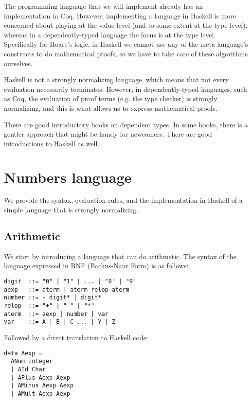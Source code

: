 \documentclass{article}
\begin{document}
The programming language that we will implement already has an implementation in Coq\cite{b3}. However, implementing a language in Haskell is more concerned about playing at the value level (and to some extent at the type level), whereas in a dependently-typed language the focus is at the type level. Specifically for Hoare's logic, in Haskell we cannot use any of the meta language's constructs to do mathematical proofs, so we have to take care of these algorithms ourselves.

Haskell is not a strongly normalizing language, which means that not every evaluation necessarily terminates. However, in dependently-typed languages, such as Coq\cite{b4}, the evaluation of proof terms (e.g. the type checker) is strongly normalizing, and this is what allows us to express mathematical proofs.

There are good introductory books on dependent types\cite{b3}. In some books, there is a gentler approach that might be handy for newcomers\cite{b5}. There are good introductions to Haskell as well\cite{b6}.

\section{Numbers language}

We provide the syntax, evaluation rules, and the implementation in Haskell of a simple language that is strongly normalizing.

\subsection{Arithmetic}

We start by introducing a language that can do arithmetic. The syntax of the language expressed in BNF (Backus-Naur Form) is as follows:

\begin{lstlisting}
digit  ::= "0" | "1" | ... | "8" | "9"
aexp   ::= aterm | aterm relop aterm
number ::= - digit* | digit*
relop  ::= "+" | "-" | "*"
aterm  ::= aexp | number | var
var    ::= A | B | C ... | Y | Z
\end{lstlisting}

Followed by a direct translation to Haskell code:

\begin{lstlisting}
data Aexp =
  ANum Integer
  | AId Char
  | APlus Aexp Aexp
  | AMinus Aexp Aexp
  | AMult Aexp Aexp
\end{lstlisting}
\end{document}
